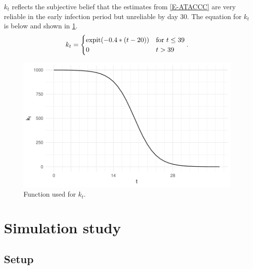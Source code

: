 \documentclass[thesis.tex]{subfiles}
\begin{document}
$k_t$ reflects the subjective belief that the estimates from \cref{E-ATACCC} are very reliable in the early infection period but unreliable by day 30.
The equation for $k_t$ is below and shown in \cref{perf-test:fig:kt}.
\begin{align}
k_t = \begin{cases}
  \operatorname{expit}(-0.4 * (t - 20)) &\text{for $t \leq 39$} \\
  0 &t > 39
\end{cases}.
\end{align}

\begin{figure}
  \centering \includegraphics{cis-perfect-testing/kt-prior}
  \caption{Function used for $k_t$. \label{perf-test:fig:kt}}
\end{figure}

\section{Simulation study} \label{perf-test:sec:simulation-study}

\subsection{Setup} \label{perf-test:sec:sim-setup}
\end{document}
